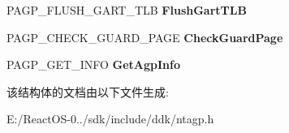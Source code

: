 \begin{DoxyCompactItemize}
\item 
\mbox{\label{struct___a_g_p___b_u_s___i_n_t_e_r_f_a_c_e___s_t_a_n_d_a_r_d_a9e74a96cbf111aa4703f60a10a71fc4d}} 
P\+A\+G\+P\+\_\+\+F\+L\+U\+S\+H\+\_\+\+G\+A\+R\+T\+\_\+\+T\+LB {\bfseries Flush\+Gart\+T\+LB}
\item 
\mbox{\label{struct___a_g_p___b_u_s___i_n_t_e_r_f_a_c_e___s_t_a_n_d_a_r_d_ac895f996c547f256fb8fafa59d2ffcf3}} 
P\+A\+G\+P\+\_\+\+C\+H\+E\+C\+K\+\_\+\+G\+U\+A\+R\+D\+\_\+\+P\+A\+GE {\bfseries Check\+Guard\+Page}
\item 
\mbox{\label{struct___a_g_p___b_u_s___i_n_t_e_r_f_a_c_e___s_t_a_n_d_a_r_d_a058b80ed9bcb54d0fbfd42e6bc6fcd0f}} 
P\+A\+G\+P\+\_\+\+G\+E\+T\+\_\+\+I\+N\+FO {\bfseries Get\+Agp\+Info}
\end{DoxyCompactItemize}


该结构体的文档由以下文件生成\+:\begin{DoxyCompactItemize}
\item 
E\+:/\+React\+O\+S-\/0../sdk/include/ddk/ntagp.\+h\end{DoxyCompactItemize}
